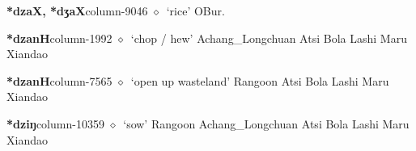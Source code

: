   \item {\footnotesize \textbf{*dzaX, *dʒaX}}{\tiny column-9046}
         $\diamond$~`rice'
         OBur. 
  \item {\footnotesize \textbf{*dzanH}}{\tiny column-1992}
         $\diamond$~`chop / hew'
         Achang\_Longchuan 
\hspace{1ex}
         Atsi 
\hspace{1ex}
         Bola 
\hspace{1ex}
         Lashi 
\hspace{1ex}
         Maru 
\hspace{1ex}
         Xiandao 
  \item {\footnotesize \textbf{*dzanH}}{\tiny column-7565}
         $\diamond$~`open up wasteland'
         Rangoon 
\hspace{1ex}
         Atsi 
\hspace{1ex}
         Bola 
\hspace{1ex}
         Lashi 
\hspace{1ex}
         Maru 
\hspace{1ex}
         Xiandao 
  \item {\footnotesize \textbf{*dziŋ}}{\tiny column-10359}
         $\diamond$~`sow'
         Rangoon 
\hspace{1ex}
         Achang\_Longchuan 
\hspace{1ex}
         Atsi 
\hspace{1ex}
         Bola 
\hspace{1ex}
         Lashi 
\hspace{1ex}
         Maru 
\hspace{1ex}
         Xiandao 
